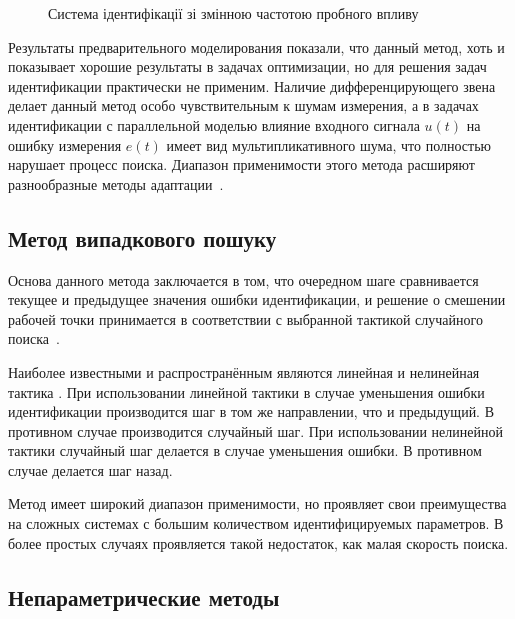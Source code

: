 \begin{figure}[htb!]
\begin{center}

\end{center}
\caption{Система ідентифікації зі змінною частотою пробного впливу}
\label{atu:f:varfreq}
\end{figure}


Результаты предварительного моделирования показали,
что данный метод, хоть и показывает хорошие результаты
в задачах оптимизации, но для решения задач идентификации
практически не применим. Наличие дифференцирующего
звена делает данный метод особо чувствительным к шумам
измерения, а в задачах идентификации с параллельной моделью
влияние входного сигнала \( u(t) \)
на ошибку измерения \( e(t) \)
имеет вид мультипликативного шума,
что полностью нарушает процесс поиска.
Диапазон применимости этого метода расширяют разнообразные методы
адаптации~\cite{auto_optim_intask}.


\subsection{Метод випадкового пошуку}%

Основа данного метода заключается в том, что
очередном шаге сравнивается текущее и предыдущее
значения ошибки идентификации, и решение о смешении
рабочей точки принимается в соответствии с выбранной
тактикой случайного поиска~\cite{rastr_rand_search,rastr_rand_search_adopt,ivanov_stoh_alg_int}.

Наиболее известными и распространённым
являются линейная и нелинейная тактика
\cite{rastr_rand_search,gladkov_optim_nongrad}.
При использовании линейной тактики
в случае уменьшения ошибки идентификации
производится шаг в том же направлении, что и предыдущий.
В противном случае производится случайный шаг.
При использовании нелинейной тактики
случайный шаг делается в случае уменьшения ошибки.
В противном случае делается шаг назад.

Метод имеет широкий диапазон применимости,
но проявляет свои преимущества на сложных
системах с большим количеством идентифицируемых параметров.
В более простых случаях проявляется такой недостаток,
как малая скорость поиска.


\subsection{Непараметрические методы} %


